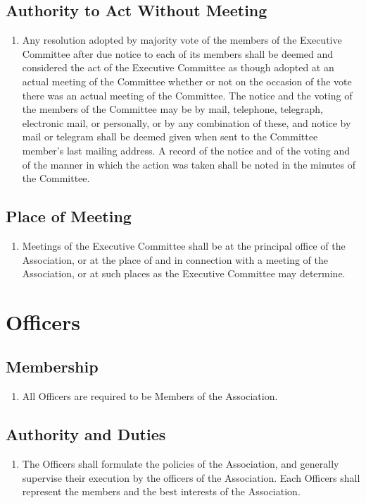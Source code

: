 \subsection{Authority to Act Without Meeting}
\begin{enumerate}
	\item Any resolution adopted by majority vote of the members of the Executive Committee after due notice to each of its members shall be deemed and considered the act of the Executive Committee as though adopted at an actual meeting of the Committee whether or not on the occasion of the vote there was an actual meeting of the Committee. The notice and the voting of the members of the Committee may be by mail, telephone, telegraph, electronic mail, or personally, or by any combination of these, and notice by mail or telegram shall be deemed given when sent to the Committee member's last mailing address. A record of the notice and of the voting and of the manner in which the action was taken shall be noted in the minutes of the Committee.
\end{enumerate}

\subsection{Place of Meeting}
\begin{enumerate}
	\item Meetings of the Executive Committee shall be at the principal office of the Association, or at the place of and in connection with a meeting of the Association, or at such places as the Executive Committee may determine.
\end{enumerate}

\section{Officers}

\subsection{Membership}
\begin{enumerate}
	\item All Officers are required to be Members of the Association.
\end{enumerate}

\subsection{Authority and Duties}
\begin{enumerate}
	\item The Officers shall formulate the policies of the Association, and generally supervise their execution by the officers of the Association. Each Officers shall represent the members and the best interests of the Association.
\end{enumerate}

